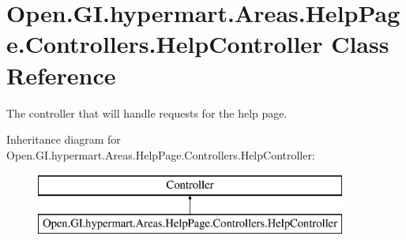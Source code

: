 \hypertarget{class_open_1_1_g_i_1_1hypermart_1_1_areas_1_1_help_page_1_1_controllers_1_1_help_controller}{}\section{Open.\+G\+I.\+hypermart.\+Areas.\+Help\+Page.\+Controllers.\+Help\+Controller Class Reference}
\label{class_open_1_1_g_i_1_1hypermart_1_1_areas_1_1_help_page_1_1_controllers_1_1_help_controller}


The controller that will handle requests for the help page.  


Inheritance diagram for Open.\+G\+I.\+hypermart.\+Areas.\+Help\+Page.\+Controllers.\+Help\+Controller\+:\begin{figure}[H]
\begin{center}
\leavevmode
\includegraphics[height=2.000000cm]{class_open_1_1_g_i_1_1hypermart_1_1_areas_1_1_help_page_1_1_controllers_1_1_help_controller}
\end{center}
\end{figure}
